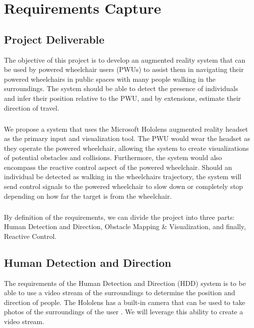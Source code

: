 \chapter{Requirements Capture}

\section{Project Deliverable}
The objective of this project is to develop an augmented reality system that can be used by powered wheelchair users (PWUs) to assist them in navigating their powered wheelchairs in public spaces with many people walking in the surroundings. The system should be able to detect the presence of individuals and infer their position relative to the PWU, and by extensions, estimate their direction of travel.

\paragraph{}We propose a system that uses the Microsoft Hololens augmented reality headset as the primary input and visualization tool. The PWU would wear the headset as they operate the powered wheelchair, allowing the system to create visualizations of potential obstacles and collisions. Furthermore, the system would also encompass the reactive control aspect of the powered wheelchair. Should an individual be detected as walking in the wheelchairs trajectory, the system will send control signals to the powered wheelchair to slow down or completely stop depending on how far the target is from the wheelchair.

\paragraph{} By definition of the requirements, we can divide the project into three parts: Human Detection and Direction, Obstacle Mapping \& Visualization, and finally, Reactive Control.

\section{Human Detection and Direction} \label{sec:reqHDD}
The requirements of the Human Detection and Direction (HDD) system is to be able to use a video stream of the surroundings to determine the position and direction of people. The Hololens has a built-in camera that can be used to take photos of the surroundings of the user \cite{Chacon-Quesada}. We will leverage this ability to create a video stream.

